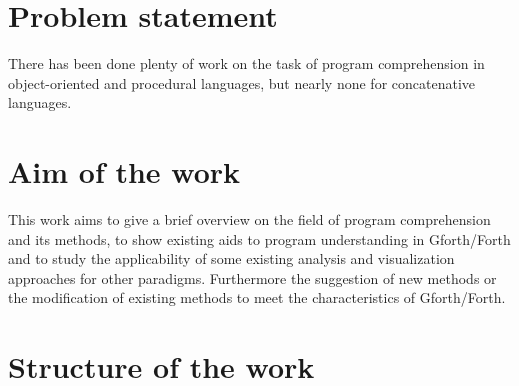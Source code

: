\begin{comment}
\hl{mental model(LaToza et al., 2006) read: ..comment}
\@inproceedings\{Lieberman:1995:BGC:223904.223969,
author = \{Lieberman, Henry and Fry, Christopher\},
title = \{Bridging the Gulf Between Code and Behavior in Programming\},
booktitle = \{Proceedings of the SIGCHI Conference on Human Factors in Computing Systems\},
series = \{CHI '95\},
year = \{1995\},
isbn = \{0-201-84705-1\},
location = \{Denver, Colorado, USA\},
pages = \{480--486\},
numpages = \{7\},
url = \{http://dx.doi.org/10.1145/223904.223969\},
doi = \{10.1145/223904.223969\},
acmid = \{223969\},
publisher = \{ACM Press/Addison-Wesley Publishing Co.\},
address = \{New York, NY, USA\},
\}
\end{comment}


\section*{Problem statement}

There has been done plenty of work on the task of program comprehension in object-oriented and procedural languages\cite{Cornelissen:2009:SSP:1638616.1639301}, but nearly none for concatenative languages. \begin{comment} The qualitative exploratory approach of this thesis does not encourage the formulation of specific hypothesis. Therefore the first question, is the applicability of existing methods and their visualization techniques. The second question to be answered, concerns new approaches, which may be exclusive to concatenative languages or Gforth/Forth.\end{comment}

\section*{Aim of the work}

This work aims to give a brief overview on the field of program comprehension and its methods, to show existing aids to program understanding in Gforth/Forth and to study the applicability of some existing analysis and visualization approaches for other paradigms. Furthermore the suggestion of new methods or the modification of existing methods to meet the characteristics of Gforth/Forth.

\section*{Structure of the work}

